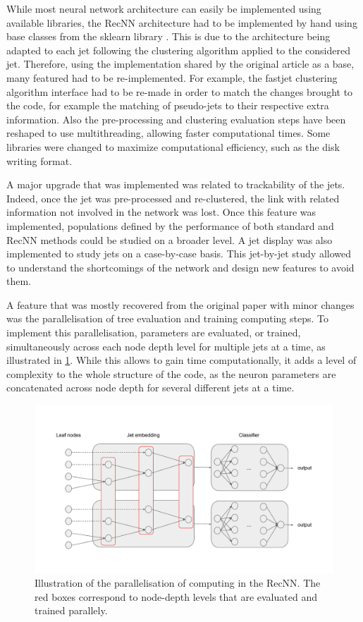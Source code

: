 While most neural network architecture can easily be implemented using available libraries, the RecNN architecture had to be implemented by hand using base classes from the sklearn library \cite{scikit-learn}. This is due to the architecture being adapted to each jet following the clustering algorithm applied to the considered jet. Therefore, using the implementation shared by the original article \cite{Louppe:2017ipp} as a base, many featured had to be re-implemented. For example, the fastjet \cite{Cacciari:2011ma} clustering algorithm interface had to be re-made in order to match the changes brought to the code, for example the matching of pseudo-jets to their respective extra information. Also the pre-processing and clustering evaluation steps have been reshaped to use multithreading, allowing faster computational times. Some libraries were changed to maximize computational efficiency, such as the disk writing format.

A major upgrade that was implemented was related to trackability of the jets. Indeed, once the jet was pre-processed and re-clustered, the link with related information not involved in the network was lost. Once this feature was implemented, populations defined by the performance of both standard and RecNN methods could be studied on a broader level. A jet display was also implemented to study jets on a case-by-case basis. This jet-by-jet study allowed to understand the shortcomings of the network and design new features to avoid them.

A feature that was mostly recovered from the original paper with minor changes was the parallelisation of tree evaluation and training computing steps. To implement this parallelisation, parameters are evaluated, or trained, simultaneously across each node depth level for multiple jets at a time, as illustrated in \ref{fig:RecNN_parall}. While this allows to gain time computationally, it adds a level of complexity to the whole structure of the code, as the neuron parameters are concatenated across node depth for several different jets at a time.

\begin{figure}
    \centering
    \includegraphics[width=\textwidth]{Images/RecNN_diagram_parall.pdf}
    \caption{Illustration of the parallelisation of computing in the RecNN. The red boxes correspond to node-depth levels that are evaluated and trained parallely.}
    \label{fig:RecNN_parall}
\end{figure}

